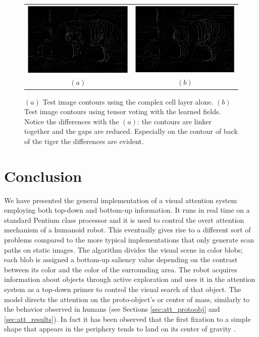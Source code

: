 \documentclass{llncs}
\begin{document}
\begin{figure}[h]
	\begin{center}
		\begin{tabular}{cc}
			\includegraphics[width=0.4\linewidth]{./figs/af/im_oe} &
			\includegraphics[width=0.4\linewidth]{./figs/af/im_pg} \\
			$(a)$ & $(b)$
		\end{tabular}
    \caption{$(a)$ Test image contours using the complex cell layer alone.
     $(b)$ Test image contours using tensor voting with the learned fields.
     Notice the differences with the $(a)$: the contours are
     linker together and the gaps are reduced. Especially on the contour of back of
     the tiger the differences are evident.}
	   \label{fig:im_oe_pg}
	\end{center}
\end{figure}


\section{Conclusion}
\label{sec:conclusion}

We have presented the general implementation of a visual
attention system employing both top-down and
bottom-up information. It runs in real time on a
standard Pentium class processor and it is used to
control the overt attention mechanism of a humanoid
robot. This eventually gives rise to a different sort of
problems compared to the more typical
implementations that only generate scan paths on static
images.
The algorithm divides the visual scene in color
blobs; each blob is assigned a bottom-up saliency value
depending on the contrast between its color and the
color of the surrounding area. The robot acquires
information about objects through active exploration
and uses it in the attention system as a top-down
primer to control the visual search of that object. The
model directs the attention on the proto-object's or
center of mass, similarly to the behavior observed in
humans (see Sections \ref{sec:att_protoobj} and
\ref{sec:att_results}). In fact it has been observed that the first
fixation to a simple shape that appears in the periphery
tends to land on its center of gravity \cite{MelcherK99}.
\end{document}
